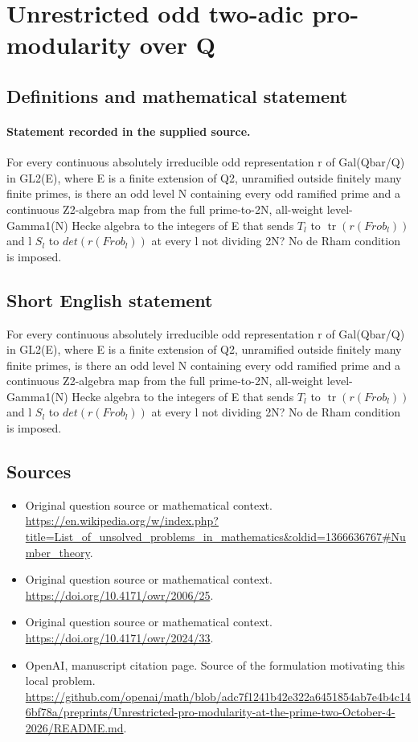 \documentclass[11pt]{article}
\begin{document}
\section*{Unrestricted odd two-adic pro-modularity over Q}\label{statement}
\subsection{Definitions and mathematical statement}
\paragraph{Statement recorded in the supplied source.}
For every continuous absolutely irreducible odd representation r of Gal(Qbar/Q) in GL2(E), where E is a finite extension of Q2, unramified outside finitely many finite primes, is there an odd level N containing every odd ramified prime and a continuous Z2-algebra map from the full prime-to-2N, all-weight level-Gamma1(N) Hecke algebra to the integers of E that sends $T_l$ to $\operatorname{tr}(r(Frob_l))$ and l $S_l$ to $det(r(Frob_l))$ at every l not dividing 2N? No de Rham condition is imposed.
\subsection{Short English statement}
For every continuous absolutely irreducible odd representation r of Gal(Qbar/Q) in GL2(E), where E is a finite extension of Q2, unramified outside finitely many finite primes, is there an odd level N containing every odd ramified prime and a continuous Z2-algebra map from the full prime-to-2N, all-weight level-Gamma1(N) Hecke algebra to the integers of E that sends $T_l$ to $\operatorname{tr}(r(Frob_l))$ and l $S_l$ to $det(r(Frob_l))$ at every l not dividing 2N? No de Rham condition is imposed.
\subsection{Sources}
\begin{itemize}
\item[S1] Original question source or mathematical context.
\url{https://en.wikipedia.org/w/index.php?title=List_of_unsolved_problems_in_mathematics&oldid=1366636767#Number_theory}.
\item[S2] Original question source or mathematical context.
\url{https://doi.org/10.4171/owr/2006/25}.
\item[S3] Original question source or mathematical context.
\url{https://doi.org/10.4171/owr/2024/33}.
\item[S4] OpenAI, manuscript citation page. Source of the formulation motivating this local problem.
\url{https://github.com/openai/math/blob/adc7f1241b42e322a6451854ab7e4b4c146bf78a/preprints/Unrestricted-pro-modularity-at-the-prime-two-October-4-2026/README.md}.
\end{itemize}
\end{document}
